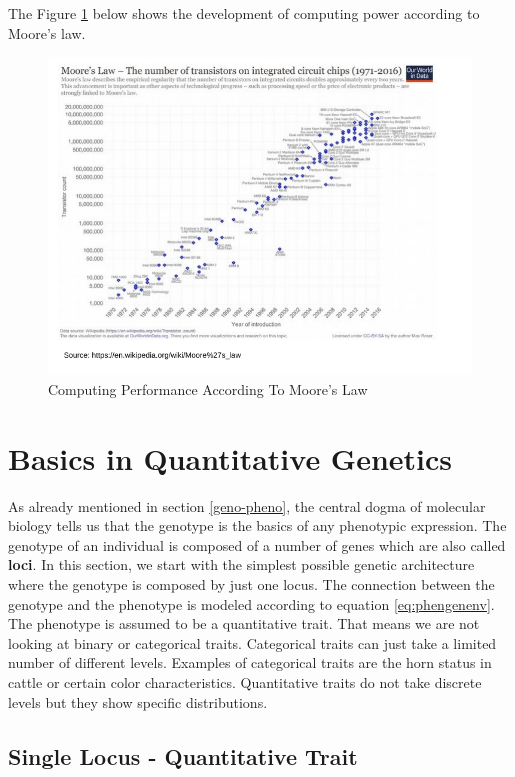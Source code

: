 \documentclass[
]{book}
\theoremstyle{definition}
\theoremstyle{definition}
\theoremstyle{definition}
\theoremstyle{remark}
\begin{document}
The Figure \ref{fig:moorelaw} below shows the development of computing power according to Moore's law.

\begin{figure}[!ht]
\includegraphics[width=7.42in,]{odg/moorelaw} \caption{Computing Performance According To Moore's Law}\label{fig:moorelaw}
\end{figure}

\hypertarget{quan-gen}{%
\chapter{Basics in Quantitative Genetics}\label{quan-gen}}

As already mentioned in section \ref{geno-pheno}, the central dogma of molecular biology tells us that the genotype is the basics of any phenotypic expression. The genotype of an individual is composed of a number of genes which are also called \textbf{loci}. In this section, we start with the simplest possible genetic architecture where the genotype is composed by just one locus. The connection between the genotype and the phenotype is modeled according to equation \eqref{eq:phengenenv}. The phenotype is assumed to be a quantitative trait. That means we are not looking at binary or categorical traits. Categorical traits can just take a limited number of different levels. Examples of categorical traits are the horn status in cattle or certain color characteristics. Quantitative traits do not take discrete levels but they show specific distributions.

\hypertarget{single-locus-quant-trait}{%
\section{Single Locus - Quantitative Trait}\label{single-locus-quant-trait}}
\end{document}
